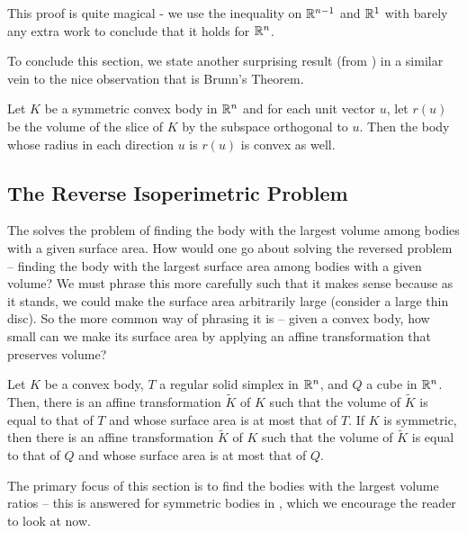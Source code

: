 This proof is quite magical - we use the inequality on $\mathbb{R}^{n-1}$ and $\mathbb{R}^1$ with barely any extra work to conclude that it holds for $\mathbb{R}^n$.

To conclude this section, we state another surprising result (from \cite{Busemann1949}) in a similar vein to the nice observation that is Brunn's Theorem.

\begin{theorem}
Let $K$ be a symmetric convex body in $\mathbb{R}^n$ and for each unit vector $u$, let $r(u)$ be the volume of the slice of $K$ by the subspace orthogonal to $u$. Then the body whose radius in each direction $u$ is $r(u)$ is convex as well.
\end{theorem}

\subsection{The Reverse Isoperimetric Problem}
\label{subsection: reverse isoperimetric problem 2.3}

The  solves the problem of finding the body with the largest volume among bodies with a given surface area. How would one go about solving the reversed problem -- finding the body with the largest surface area among bodies with a given volume? We must phrase this more carefully such that it makes sense because as it stands, we could make the surface area arbitrarily large (consider a large thin disc). So the more common way of phrasing it is -- given a convex body, how small can we make its surface area by applying an affine transformation that preserves volume?

\begin{theorem}
\label{reverse isoperimetric}
Let $K$ be a convex body, $T$ a regular solid simplex in $\mathbb{R}^n$, and $Q$ a cube in $\mathbb{R}^n$. Then, there is an affine transformation $\tilde{K}$ of $K$ such that the volume of $\tilde{K}$ is equal to that of $T$ and whose surface area is at most that of $T$. If $K$ is symmetric, then there is an affine transformation $\tilde{K}$ of $K$ such that the volume of $\tilde{K}$ is equal to that of $Q$ and whose surface area is at most that of $Q$.
\end{theorem}

The primary focus of this section is to find the bodies with the largest volume ratios -- this is answered for symmetric bodies in , which we encourage the reader to look at now.\\

